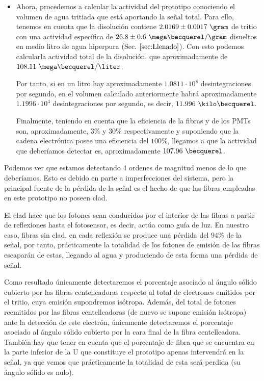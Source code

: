 \begin{itemize}
\item{} Ahora, procedemos a calcular la actividad del prototipo conociendo el volumen de agua tritiada que está aportando  la señal total. Para ello, tenemos en cuenta que la disolución contiene $2.0169 \pm 0.0017~\gram$ de tritio con una actividad específica de $26.8 \pm 0.6~\mega\becquerel/\gram$ disueltos en medio litro de agua hiperpura (Sec. $\ref{sec:Llenado}$). Con esto podemos calcularla actividad total de la disolución, que aproximadamente de $108.11~\mega\becquerel/\liter$. 

Por tanto, si en un litro hay aproximadamente $1.0811\cdotp 10^{8}$ desintegraciones por segundo, en el volumen calculado anteriormente habrá aproximadamente $1.1996\cdotp 10^{4}$ desintegraciones por segundo, es decir, $11.996~\kilo\becquerel$.

Finalmente, teniendo en cuenta que la eficiencia de la fibras y de los PMTs son, aproximadamente, 3\% y 30\% respectivamente y suponiendo que la cadena electrónica posee una eficiencia del $100\%$, llegamos a que la actividad que deberíamos detectar es, aproximadamente $107.96~\becquerel$.

\end{itemize}

Podemos ver que estamos detectando 4 ordenes de magnitud menos de lo que deberíamos. Esto es debido en parte a imperfecciones del sistema, pero la principal fuente de la pérdida de la señal es  el hecho de que las fibras empleadas en este prototipo no poseen clad. 

El clad hace que los fotones sean conducidos por el interior de las fibras a partir de reflexiones hasta el fotosensor, es decir, actúa como guía de luz. En nuestro caso, fibras sin clad, en cada reflexión se produce una pérdida del $94\%$ de la señal, por tanto, prácticamente la totalidad de los fotones de emisión de las fibras escaparán de estas, llegando al agua y produciendo de esta forma una pérdida de señal. 

Como resultado únicamente detectaremos el porcentaje asociado al ángulo sólido cubierto por las fibras centelleadoras respecto al total de electrones emitidos por el tritio, cuya emisión supondremos isótropa. Además, del total de fotones reemitidos por las fibras centelleadoras (de nuevo se supone emisión isótropa) ante la detección de este electrón, únicamente detectaremos el porcentaje asociado al ángulo sólido cubierto por la cara final de la fibra centelleadora. También hay que tener en cuenta que el porcentaje de fibra que se encuentra en la parte inferior de la U que constituye el prototipo apenas intervendrá en la señal, ya que vemos que prácticamente la totalidad de esta será perdida (su ángulo sólido es nulo). 

